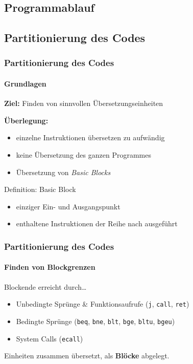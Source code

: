 \subsection{Programmablauf} %

\subsection{Partitionierung des Codes} %
\begin{frame}
	\frametitle{Partitionierung des Codes}
	\framesubtitle{Grundlagen}
	\textbf{Ziel:} Finden von sinnvollen Übersetzungseinheiten
	
	\vspace{0.50cm}
	
	\pause
	\textbf{Überlegung:}
	\begin{itemize}
		\item einzelne Instruktionen übersetzen zu aufwändig
		\item keine Übersetzung des ganzen Programmes
		\item[\conclude] Übersetzung von \textit{Basic Blocks}
	\end{itemize}
	
	\vspace{0.50cm}
	
	\pause
	\begin{block}{Definition: Basic Block}
		\begin{itemize}
			\item einziger Ein- und Ausgangspunkt
			\item enthaltene Instruktionen der Reihe nach ausgeführt
		\end{itemize}
	\end{block}
\end{frame}

\begin{frame}
	\frametitle{Partitionierung des Codes}
	\framesubtitle{Finden von Blockgrenzen}
	
	\begin{block}{Blockende erreicht durch\ldots}
		\begin{itemize}
			\item Unbedingte Sprünge \& Funktionsaufrufe (\texttt{j}, \texttt{call}, \texttt{ret})
			\item Bedingte Sprünge (\texttt{beq}, \texttt{bne}, \texttt{blt}, \texttt{bge}, \texttt{bltu}, \texttt{bgeu})
			\item System Calls (\texttt{ecall})
		\end{itemize}
	\end{block}
	
	\vspace{0.50cm}
	
	Einheiten zusammen übersetzt, als \textbf{Blöcke} abgelegt.
	
\end{frame}


